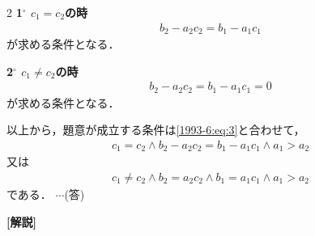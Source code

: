 \documentclass[../../../../main.tex]{subfiles}
\begin{document}
\begin{multicols}{2}
  \textbf{1$^\circ$ $c_1 = c_2$の時}
  \begin{align*}
    b_2 - a_2 c_2 = b_1 - a_1 c_1
  \end{align*}
  が求める条件となる．

  \textbf{2$^\circ$ $c_1 \ne c_2$の時}
  \begin{align*}
    b_2 - a_2 c_2 = b_1 - a_1 c_1 = 0
  \end{align*}
  が求める条件となる．

  以上から，題意が成立する条件は\cref{1993-6:eq:3}と合わせて，
  \begin{align*}
    c_1 = c_2 \land b_2 - a_2 c_2 = b_1 - a_1 c_1 \land a_1 > a_2
  \end{align*}
  又は
  \begin{align*}
    c_1 \ne c_2 \land b_2 = a_2 c_2 \land b_1 = a_1 c_1 \land a_1 > a_2
  \end{align*}
  である．  $\cdots$(答)


  {\bf[解説]}

  \newpage
\end{multicols}
\end{document}
